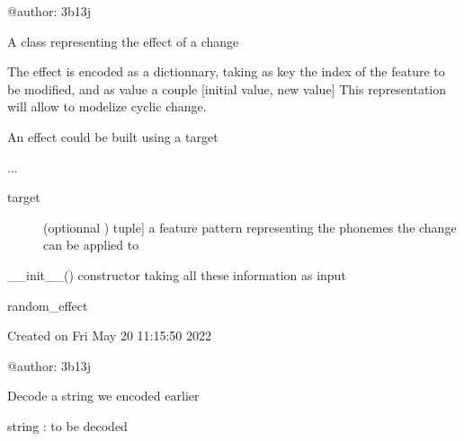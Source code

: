 \documentclass[letterpaper,10pt,english]{sphinxmanual}
\begin{document}
\sphinxAtStartPar
@author: 3b13j

\begin{fulllineitems}
\label{\detokenize{index:id0}}
\sphinxAtStartPar
A class representing the effect of a change

\sphinxAtStartPar
The effect is encoded as a dictionnary, taking as key the index of the feature to be modified, and
as value a couple {[}initial value, new value{]}
This representation will allow to modelize cyclic change.

\sphinxAtStartPar
An effect could be built using a target

\sphinxAtStartPar
...
\begin{description}
\item[{target}] \leavevmode{[}(optionnal ) tuple{]}
\sphinxAtStartPar
a feature pattern representing the phonemes the change can be applied to

\end{description}

\sphinxAtStartPar
\_\_init\_\_() constructor taking all these information as input

\sphinxAtStartPar
random\_effect

\end{fulllineitems}

\label{\detokenize{index:module-encoder_decoder}}
\sphinxAtStartPar
Created on Fri May 20 11:15:50 2022

\sphinxAtStartPar
@author: 3b13j

\begin{fulllineitems}
\label{\detokenize{index:encoder_decoder.decode_f}}
\sphinxAtStartPar
Decode a string we encoded earlier

\sphinxAtStartPar
string : to be decoded

\end{fulllineitems}
\end{document}
